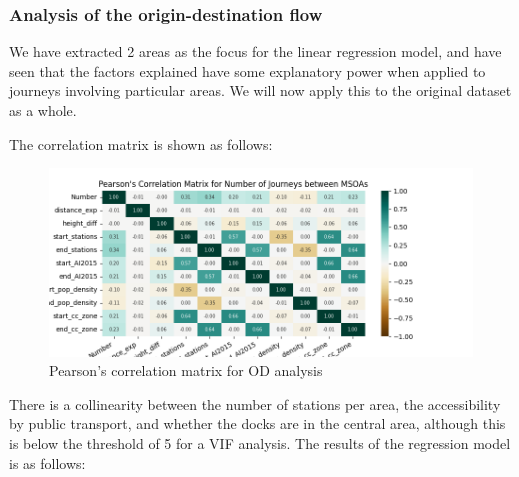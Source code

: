 \documentclass[
  a4paper,
  DIV=11,
  numbers=noendperiod]{scrartcl}
\begin{document}
\hypertarget{analysis-of-the-origin-destination-flow}{%
\subsubsection{Analysis of the origin-destination
flow}\label{analysis-of-the-origin-destination-flow}}

We have extracted 2 areas as the focus for the linear regression model,
and have seen that the factors explained have some explanatory power
when applied to journeys involving particular areas. We will now apply
this to the original dataset as a whole.

The correlation matrix is shown as follows:

\begin{figure}

{\centering \includegraphics{img/cor_matrix_MSOA.png}

}

\caption{Pearson's correlation matrix for OD analysis}

\end{figure}

There is a collinearity between the number of stations per area, the
accessibility by public transport, and whether the docks are in the
central area, although this is below the threshold of 5 for a VIF
analysis. The results of the regression model is as follows:
\end{document}
